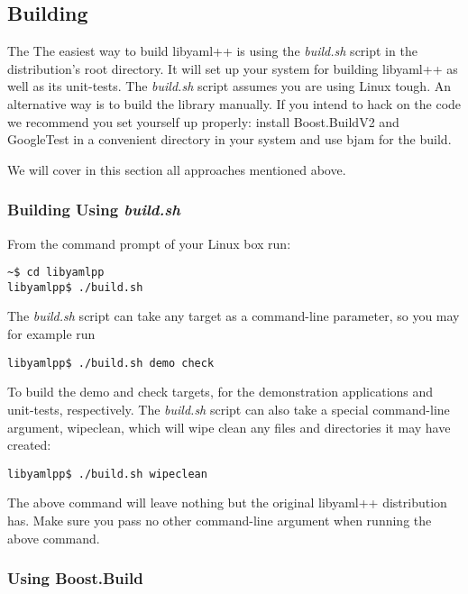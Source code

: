 \documentclass{article}
\begin{document}
\subsection{Building}

The The easiest way to build libyaml++ is using the \textit{build.sh} script in the
distribution's root directory.  It will set up your system for building
libyaml++ as well as its unit-tests.  The \textit{build.sh} script assumes you are using
Linux tough.  An alternative way is to build the library manually.  If you
intend to hack on the code we recommend you set yourself up properly:  install
Boost.BuildV2 and GoogleTest in a convenient directory in your system and use
bjam for the build.

We will cover in this section all approaches mentioned above.

\subsubsection{Building Using \textit{build.sh}}

From the command prompt of your Linux box run:

\begin{verbatim}
~$ cd libyamlpp
libyamlpp$ ./build.sh
\end{verbatim}

The \textit{build.sh} script can take any target as a command-line parameter, so you may
for example run

\begin{verbatim}
libyamlpp$ ./build.sh demo check
\end{verbatim}

To build the demo and check targets, for the demonstration applications and
unit-tests, respectively.  The \textit{build.sh} script can also take a special
command-line argument, wipeclean, which will wipe clean any files and
directories it may have created:

\begin{verbatim}
libyamlpp$ ./build.sh wipeclean
\end{verbatim}

The above command will leave nothing but the original libyaml++ distribution
has.  Make sure you pass no other command-line argument when running the above
command.

\subsubsection{Using Boost.Build}
\end{document}
